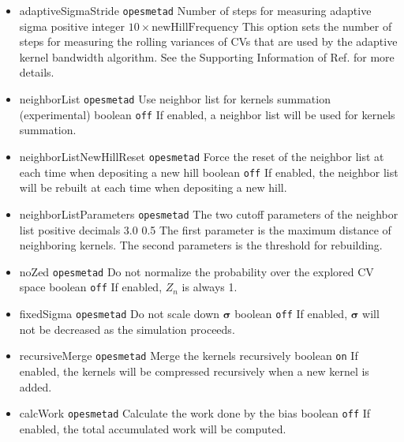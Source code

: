 \begin{itemize}
\item %
  \keydef
    {adaptiveSigmaStride}{%
    \texttt{opes{\textunderscore}metad}}{%
    Number of steps for measuring adaptive sigma}{%
    positive integer}{%
    $10\times\mathrm{newHillFrequency}$}{%
    This option sets the number of steps for measuring the rolling variances of CVs that are used by the adaptive kernel bandwidth algorithm. See the Supporting Information of Ref.\cite{Invernizzi2022} for more details.}
\item %
  \keydef
    {neighborList}{%
    \texttt{opes{\textunderscore}metad}}{%
    Use neighbor list for kernels summation (experimental)}{%
    boolean}{%
    \texttt{off}}{%
    If enabled, a neighbor list will be used for kernels summation.}
\item %
  \keydef
    {neighborListNewHillReset}{%
    \texttt{opes{\textunderscore}metad}}{%
    Force the reset of the neighbor list at each time when depositing a new hill}{%
    boolean}{%
    \texttt{off}}{%
    If enabled, the neighbor list will be rebuilt at each time when depositing a new hill.}
\item %
  \keydef
    {neighborListParameters}{%
    \texttt{opes{\textunderscore}metad}}{%
    The two cutoff parameters of the neighbor list}{%
    positive decimals}{%
    3.0 0.5}{%
    The first parameter is the maximum distance of neighboring kernels. The second parameters is the threshold for rebuilding.}
\item %
  \keydef
    {noZed}{%
    \texttt{opes{\textunderscore}metad}}{%
    Do not normalize the probability over the explored CV space}{%
    boolean}{%
    \texttt{off}}{%
    If enabled, $Z_n$ is always 1.}
\item %
  \keydef
    {fixedSigma}{%
    \texttt{opes{\textunderscore}metad}}{%
    Do not scale down $\boldsymbol{\sigma}$}{%
    boolean}{%
    \texttt{off}}{%
    If enabled, $\boldsymbol{\sigma}$ will not be decreased as the simulation proceeds.}
\item %
  \keydef
    {recursiveMerge}{%
    \texttt{opes{\textunderscore}metad}}{%
    Merge the kernels recursively}{%
    boolean}{%
    \texttt{on}}{%
    If enabled, the kernels will be compressed recursively when a new kernel is added.}
\item %
  \keydef
    {calcWork}{%
    \texttt{opes{\textunderscore}metad}}{%
    Calculate the work done by the bias}{%
    boolean}{%
    \texttt{off}}{%
    If enabled, the total accumulated work will be computed.}
\end{itemize}


